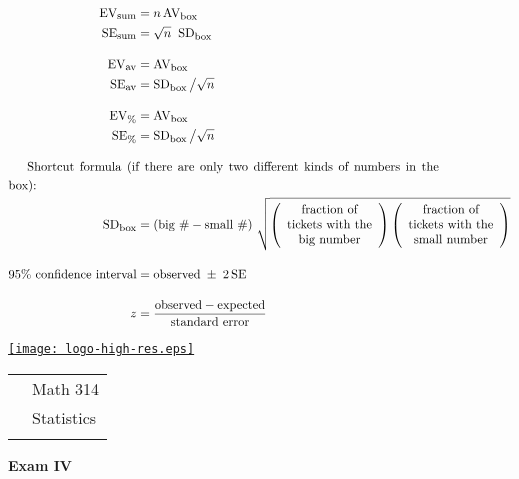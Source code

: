 \documentclass[10pt]{article}
\begin{document}
\begin{align*}
\mbox{EV}_{\mbox{\footnotesize sum}} & = n\,\mbox{AV}_{\mbox{\footnotesize box}}\\
\mbox{SE}_{\mbox{\footnotesize sum}} & = \sqrt{n}\;\;\mbox{SD}_{\mbox{\footnotesize box}}\\[10pt]
%
\mbox{EV}_{\mbox{\footnotesize av}} & = \mbox{AV}_{\mbox{\footnotesize box}}\\
\mbox{SE}_{\mbox{\footnotesize av}} & = \mbox{SD}_{\mbox{\footnotesize box}}\,\big{/}\sqrt{n}\\[10pt]
%
\mbox{EV}_{\mbox{\footnotesize \%}} & = \mbox{AV}_{\mbox{\footnotesize box}}\\
\mbox{SE}_{\mbox{\footnotesize \%}} & = \mbox{SD}_{\mbox{\footnotesize box}}\,\big{/}\sqrt{n}\\[10pt]
%
\noalign{Shortcut formula (if there are only two different kinds of numbers in the box):}
\mbox{SD}_{\mbox{\footnotesize box}} &=
  \left(\mbox{big \#} - \mbox{small \#}\right)\,\sqrt{
  \left(\begin{array}{c}\mbox{fraction of}\\ \mbox{tickets with the}\\ \mbox{big number}\end{array}\right)
  \left(\begin{array}{c}\mbox{fraction of}\\\mbox{tickets with the}\\\mbox{small number}\end{array}\right)}\\[10pt]
%
\mbox{95\% confidence interval} &= \mbox{observed} \;\pm\; 2\,\mbox{SE}\\[10pt]
z &= \frac{\mbox{observed} - \mbox{expected}}{\mbox{standard error}}
\end{align*}
\eject


\href{http://www.shepherd.edu}{\texttt{[image: logo-high-res.eps]}}
\vspace{-1.69cm}

{\small
\begin{tabular}{cl}
& Math 314\\
& Statistics\\
\hspace{5.28in} & %
\end{tabular}
}
\begin{center}
\textbf{\large  Exam IV}
\end{center}
\medskip
\end{document}
